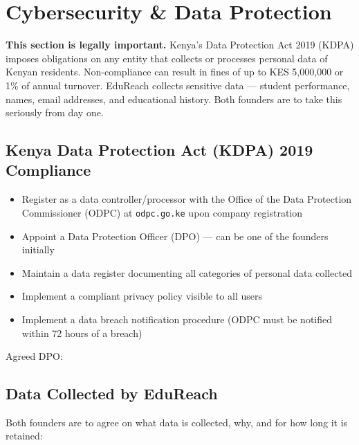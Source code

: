 \documentclass[12pt,a4paper]{article}
\newcommand{\blank}[1][5.5cm]{\underline{\hspace{#1}}}
\newcommand{\cb}{$\square$\;}                   %
\begin{document}
\section{Cybersecurity \& Data Protection}

\begin{warnbox}
\textbf{This section is legally important.} Kenya's Data Protection Act 2019 (KDPA) imposes obligations on any entity that collects or processes personal data of Kenyan residents. Non-compliance can result in fines of up to KES 5{,}000{,}000 or 1\% of annual turnover. EduReach collects sensitive data --- student performance, names, email addresses, and educational history. Both founders are to take this seriously from day one.
\end{warnbox}

\subsection{Kenya Data Protection Act (KDPA) 2019 Compliance}

\begin{itemize}[label=\cb]
  \item Register as a data controller/processor with the Office of the Data Protection Commissioner (ODPC) at \texttt{odpc.go.ke} upon company registration
  \item Appoint a Data Protection Officer (DPO) --- can be one of the founders initially
  \item Maintain a data register documenting all categories of personal data collected
  \item Implement a compliant privacy policy visible to all users
  \item Implement a data breach notification procedure (ODPC must be notified within 72 hours of a breach)
\end{itemize}

\noindent Agreed DPO: \blank[5cm]

\subsection{Data Collected by EduReach}

Both founders are to agree on what data is collected, why, and for how long it is retained:
\end{document}
